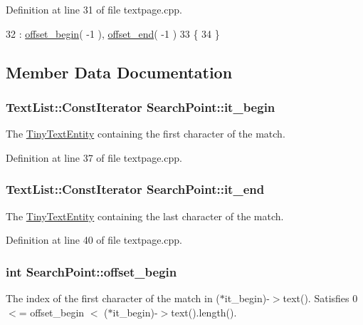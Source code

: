 Definition at line 31 of file textpage.\+cpp.


\begin{DoxyCode}
32             : \hyperlink{classSearchPoint_aeac3cb8bdd76805bcf76e9b191732139}{offset\_begin}( -1 ), \hyperlink{classSearchPoint_ad727c2d1a0467af554fd1fe38d2c757c}{offset\_end}( -1 )
33         \{
34         \}
\end{DoxyCode}


\subsection{Member Data Documentation}
\hypertarget{classSearchPoint_a2fbb5753fdf7adba3318560e9199f502}{
\subsubsection[{it\+\_\+begin}]{\setlength{\rightskip}{0pt plus 5cm}Text\+List\+::\+Const\+Iterator Search\+Point\+::it\+\_\+begin}}\label{classSearchPoint_a2fbb5753fdf7adba3318560e9199f502}
The \hyperlink{classTinyTextEntity}{Tiny\+Text\+Entity} containing the first character of the match. 

Definition at line 37 of file textpage.\+cpp.

\hypertarget{classSearchPoint_a98ba2c6327cca4a7834238a9e67a7799}{
\subsubsection[{it\+\_\+end}]{\setlength{\rightskip}{0pt plus 5cm}Text\+List\+::\+Const\+Iterator Search\+Point\+::it\+\_\+end}}\label{classSearchPoint_a98ba2c6327cca4a7834238a9e67a7799}
The \hyperlink{classTinyTextEntity}{Tiny\+Text\+Entity} containing the last character of the match. 

Definition at line 40 of file textpage.\+cpp.

\hypertarget{classSearchPoint_aeac3cb8bdd76805bcf76e9b191732139}{
\subsubsection[{offset\+\_\+begin}]{\setlength{\rightskip}{0pt plus 5cm}int Search\+Point\+::offset\+\_\+begin}}\label{classSearchPoint_aeac3cb8bdd76805bcf76e9b191732139}
The index of the first character of the match in ($\ast$it\+\_\+begin)-\/$>$text(). Satisfies 0 $<$= offset\+\_\+begin $<$ ($\ast$it\+\_\+begin)-\/$>$text().length(). 

